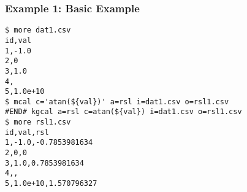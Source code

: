 \subsubsection*{Example 1: Basic Example}



\begin{Verbatim}[baselinestretch=0.7,frame=single]
$ more dat1.csv
id,val
1,-1.0
2,0
3,1.0
4,
5,1.0e+10
$ mcal c='atan(${val})' a=rsl i=dat1.csv o=rsl1.csv
#END# kgcal a=rsl c=atan(${val}) i=dat1.csv o=rsl1.csv
$ more rsl1.csv
id,val,rsl
1,-1.0,-0.7853981634
2,0,0
3,1.0,0.7853981634
4,,
5,1.0e+10,1.570796327
\end{Verbatim}
